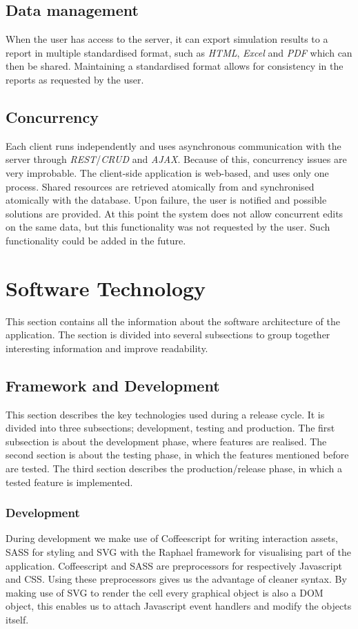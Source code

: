 \documentclass{report}
\begin{document}
		\subsection{Data management}
			When the user has access to the server, it can export simulation results to a report in multiple standardised format, such as \emph{HTML}, \emph{Excel} and \emph{PDF} which can then be shared. Maintaining a standardised format allows for consistency in the reports as requested by the user.		
	
		\subsection{Concurrency}
			Each client runs independently and uses asynchronous communication with the server through \emph{REST}/\emph{CRUD} and \emph{AJAX}. Because of this, concurrency issues are very improbable. The client-side application is web-based, and uses only one process. Shared resources are retrieved atomically from and synchronised atomically with the database. Upon failure, the user is notified and possible solutions are provided. At this point the system does not allow concurrent edits on the same data, but this functionality was not requested by the user. Such functionality could be added in the future.\\		
			
	\clearpage
	\section{Software Technology}
		This section contains all the information about the software architecture of the application. The section is divided into several subsections to group together interesting information and improve readability.	
		
		\subsection{Framework and Development}
			This section describes the key technologies used during a release cycle.
			It is divided into three subsections; development, testing and production.
			The first subsection is about the development phase, where features are realised.
			The second section is about the testing phase, in which the features mentioned before are tested.
			The third section describes the production/release phase, in which a tested feature is implemented.
			
			\subsubsection{Development}
				During development we make use of Coffeescript \cite{coffeescript} for writing interaction assets, SASS \cite{sass} for styling and SVG \cite{svg} with the Raphael \cite{raphael} framework for visualising part of the application.
				Coffeescript and SASS are preprocessors for respectively Javascript and CSS. Using these preprocessors gives us the advantage of cleaner syntax.
				By making use of SVG to render the cell every graphical object is also a DOM object, this enables us to attach Javascript event handlers and modify the objects itself.
				
\end{document}
